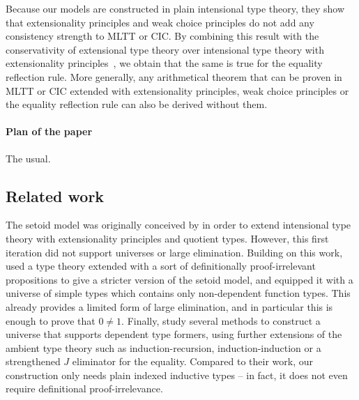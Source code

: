 \documentclass[acmsmall,screen,review]{acmart}
\begin{document}
Because our models are constructed in plain intensional type theory, they
show that extensionality principles and weak choice principles do not add any
consistency strength to MLTT or CIC.
%
By combining this result with the conservativity of extensional type theory over
intensional type theory with extensionality principles~\citep{hofmann1995conservativity, winterhalter_ett},
we obtain that the same is true for the equality reflection rule.
%
More generally, any arithmetical theorem that can be proven in MLTT or CIC
extended with extensionality principles, weak choice principles or the equality
reflection rule can also be derived without them.


\paragraph{Plan of the paper}

{\color{red} The usual.}

\subsection{Related work}

The setoid model was originally conceived by \citet{hofmann95} in order to
extend intensional type theory with extensionality principles and quotient
types.
%
However, this first iteration did not support universes or large elimination.
%
Building on this work, \citet{altenkirch99} used a type theory extended with a sort
of definitionally proof-irrelevant propositions to give a stricter version of
the setoid model, and equipped it with a universe of simple types which contains
only non-dependent function types.
%
This already provides a limited form of large elimination, and in particular this
is enough to prove that \( 0 \neq 1 \).
%
Finally, \citet{setoid_univ} study several methods to construct a universe that
supports dependent type formers, using further extensions of the ambient type
theory such as induction-recursion, induction-induction or a strengthened \( J \)
eliminator for the equality. Compared to their work, our construction only needs
plain indexed inductive types -- in fact, it does not even require definitional
proof-irrelevance.
\end{document}
